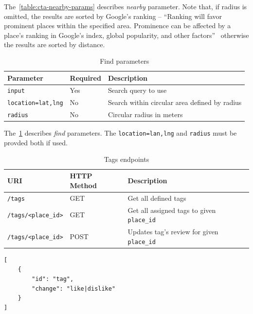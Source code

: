 The~\cref{table:cta-nearby-params} describes \textit{nearby} parameter. Note that, if radius is omitted, the results are sorted by Google's ranking -- ``Ranking will favor prominent places within the specified area. Prominence can be affected by a place's ranking in Google's index, global popularity, and other factors''~\cite{google-places-api-nearby-req} otherwise the results are sorted by distance. 
\begin{table}[ht]
\centering
\begin{tabularx}{\textwidth}{|l|l|X|}
\hline
\textbf{Parameter} & \textbf{Required} & \textbf{Description} \\ \hline
\verb|input| & Yes & Search query to use \\ \hline
\verb|location=lat,lng| & No & Search within circular area defined by radius \\ \hline
\verb|radius| & No & Circular radius in meters\\ \hline
\end{tabularx}
\caption{Find parameters}
\label{table:cta-find-params}
\end{table}

The~\cref{table:cta-find-params} describes \textit{find} parameters. The \verb|location=lan,lng| and \verb|radius| must be provded both if used. 
\begin{table}[ht]
\centering
\begin{tabularx}{\textwidth}{|l|l|X|}
\hline
\textbf{URI} & \textbf{HTTP Method} & \textbf{Description} \\ \hline
\verb|/tags| & GET & Get all defined tags \\ \hline
\verb|/tags/<place_id>| & GET & Get all assigned tags to given \verb|place_id| \\ \hline
\verb|/tags/<place_id>| & POST & Updates tag's review for given \verb|place_id| \\ \hline
\end{tabularx}
\caption{Tags endpoints}
\label{table:cta-tags}
\end{table}

\begin{listing}[ht]
\begin{verbatim}
[
    {
        "id": "tag",
        "change": "like|dislike"
    }
]
\end{verbatim}
\caption{Tag update content example}
\label{listing:tag-update-post}
\end{listing}


